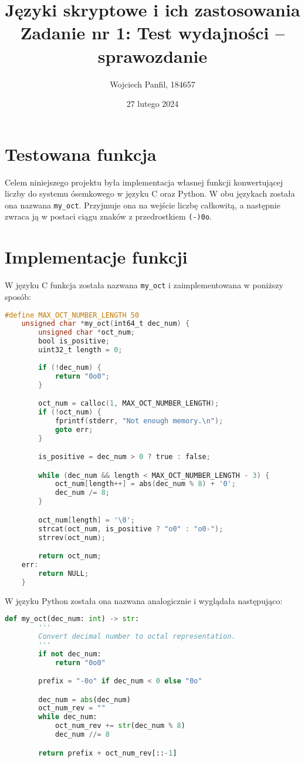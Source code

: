 \documentclass[11pt]{article}
\title{
	\textbf{Języki skryptowe i ich zastosowania}\\
	Zadanie nr 1: Test wydajności -- sprawozdanie}
\author{Wojciech Panfil, 184657}
\date{27 lutego 2024}
\begin{document}
	\maketitle
	
	\section{Testowana funkcja}
	\justify
	Celem niniejszego projektu była implementacja własnej funkcji
	konwertującej liczby do systemu ósemkowego w języku C oraz Python.
	W obu językach została ona nazwana \texttt{my\_oct}.
	Przyjmuje ona na wejście liczbę całkowitą, a następnie zwraca ją w
	postaci ciągu znaków z przedrostkiem \texttt{(-)0o}.

	\section{Implementacje funkcji}
	W języku C funkcja została nazwana \texttt{my\_oct} i zaimplementowana w poniższy sposób:
	\begin{lstlisting}[language=C, caption={Implementacja w języku C},captionpos=b]
	#define MAX_OCT_NUMBER_LENGTH 50
	unsigned char *my_oct(int64_t dec_num) {
		unsigned char *oct_num;
		bool is_positive;
		uint32_t length = 0;
		
		if (!dec_num) {
			return "0o0";
		}

		oct_num = calloc(1, MAX_OCT_NUMBER_LENGTH);
		if (!oct_num) {
			fprintf(stderr, "Not enough memory.\n");
			goto err;
		}

		is_positive = dec_num > 0 ? true : false;

		while (dec_num && length < MAX_OCT_NUMBER_LENGTH - 3) {
			oct_num[length++] = abs(dec_num % 8) + '0';
			dec_num /= 8;
		}

		oct_num[length] = '\0';
		strcat(oct_num, is_positive ? "o0" : "o0-");
		strrev(oct_num);

		return oct_num;
	err:
		return NULL;
	}
	\end{lstlisting}

	W języku Python została ona nazwana analogicznie i wyglądała następująco:

	\begin{lstlisting}[language=Python, caption={Implementacja w języku Python},captionpos=b]
	def my_oct(dec_num: int) -> str:
		'''
		Convert decimal number to octal representation.
		'''
		if not dec_num:
			return "0o0"

		prefix = "-0o" if dec_num < 0 else "0o"

		dec_num = abs(dec_num)
		oct_num_rev = ""
		while dec_num:
			oct_num_rev += str(dec_num % 8)
			dec_num //= 8

		return prefix + oct_num_rev[::-1]
	\end{lstlisting}
	
\end{document}
